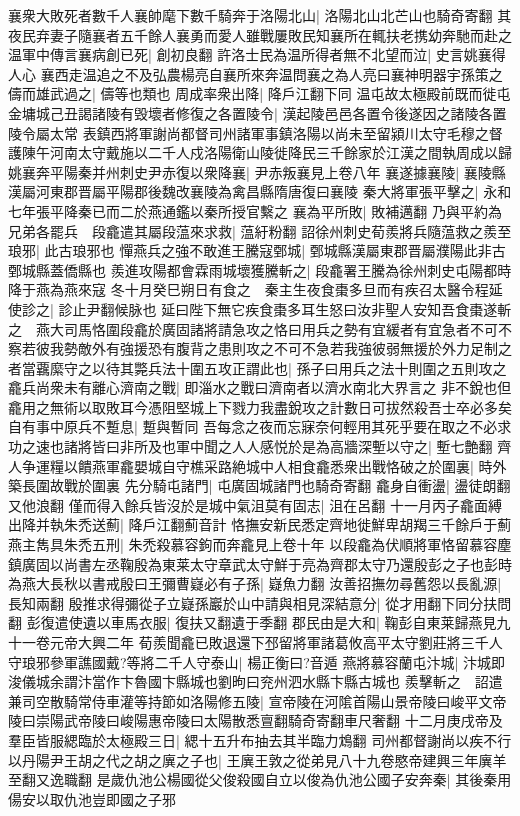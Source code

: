 襄衆大敗死者數千人襄帥麾下數千騎奔于洛陽北山|{
	洛陽北山北芒山也騎奇寄翻}
其夜民弃妻子隨襄者五千餘人襄勇而愛人雖戰屢敗民知襄所在輒扶老携幼奔馳而赴之温軍中傳言襄病創已死|{
	創初良翻}
許洛士民為温所得者無不北望而泣|{
	史言姚襄得人心}
襄西走温追之不及弘農楊亮自襄所來奔温問襄之為人亮曰襄神明器宇孫策之儔而雄武過之|{
	儔等也類也}
周成率衆出降|{
	降戶江翻下同}
温屯故太極殿前既而徙屯金墉城己丑謁諸陵有毁壞者修復之各置陵令|{
	漢起陵邑邑各置令後遂因之諸陵各置陵令屬太常}
表鎮西將軍謝尚都督司州諸軍事鎮洛陽以尚未至留潁川太守毛穆之督護陳午河南太守戴施以二千人戍洛陽衛山陵徙降民三千餘家於江漢之間執周成以歸姚襄奔平陽秦并州刺史尹赤復以衆降襄|{
	尹赤叛襄見上卷八年}
襄遂據襄陵|{
	襄陵縣漢屬河東郡晋屬平陽郡後魏改襄陵為禽昌縣隋唐復曰襄陵}
秦大將軍張平擊之|{
	永和七年張平降秦已而二於燕通鑑以秦所授官繫之}
襄為平所敗|{
	敗補邁翻}
乃與平約為兄弟各罷兵　段龕遣其屬段蕰來求救|{
	蕰紆粉翻}
詔徐州刺史荀羨將兵隨蕰救之羨至琅邪|{
	此古琅邪也}
憚燕兵之強不敢進王騰寇鄄城|{
	鄄城縣漢屬東郡晋屬濮陽此非古鄄城縣蓋僑縣也}
羨進攻陽都會霖雨城壞獲騰斬之|{
	段龕署王騰為徐州刺史屯陽都時降于燕為燕來寇}
冬十月癸巳朔日有食之　秦主生夜食棗多旦而有疾召太醫令程延使診之|{
	診止尹翻候脉也}
延曰陛下無它疾食棗多耳生怒曰汝非聖人安知吾食棗遂斬之　燕大司馬恪圍段龕於廣固諸將請急攻之恪曰用兵之勢有宜緩者有宜急者不可不察若彼我勢敵外有強援恐有腹背之患則攻之不可不急若我強彼弱無援於外力足制之者當覊縻守之以待其斃兵法十圍五攻正謂此也|{
	孫子曰用兵之法十則圍之五則攻之}
龕兵尚衆未有離心濟南之戰|{
	即淄水之戰曰濟南者以濟水南北大界言之}
非不銳也但龕用之無術以取敗耳今憑阻堅城上下戮力我盡銳攻之計數日可拔然殺吾士卒必多矣自有事中原兵不蹔息|{
	蹔與暫同}
吾每念之夜而忘寐奈何輕用其死乎要在取之不必求功之速也諸將皆曰非所及也軍中聞之人人感悦於是為高牆深塹以守之|{
	塹七艶翻}
齊人争運糧以饋燕軍龕嬰城自守樵采路絶城中人相食龕悉衆出戰恪破之於圍裏|{
	時外築長圍故戰於圍裏}
先分騎屯諸門|{
	屯廣固城諸門也騎奇寄翻}
龕身自衝盪|{
	盪徒朗翻又他浪翻}
僅而得入餘兵皆沒於是城中氣沮莫有固志|{
	沮在呂翻}
十一月丙子龕面縛出降并執朱禿送薊|{
	降戶江翻薊音計}
恪撫安新民悉定齊地徙鮮卑胡羯三千餘戶于薊燕主雋具朱禿五刑|{
	朱禿殺慕容鉤而奔龕見上卷十年}
以段龕為伏順將軍恪留慕容塵鎮廣固以尚書左丞鞠殷為東莱太守章武太守鮮于亮為齊郡太守乃還殷彭之子也彭時為燕大長秋以書戒殷曰王彌曹嶷必有子孫|{
	嶷魚力翻}
汝善招撫勿尋舊怨以長亂源|{
	長知兩翻}
殷推求得彌從子立嶷孫巖於山中請與相見深結意分|{
	從才用翻下同分扶問翻}
彭復遣使遺以車馬衣服|{
	復扶又翻遺于季翻}
郡民由是大和|{
	鞠彭自東莱歸燕見九十一卷元帝大興二年}
荀羨聞龕已敗退還下邳留將軍諸葛攸高平太守劉莊將三千人守琅邪參軍譙國戴?等將二千人守泰山|{
	楊正衡曰?音遁}
燕將慕容蘭屯汴城|{
	汴城即浚儀城余謂汴當作卞魯國卞縣城也劉昫曰兖州泗水縣卞縣古城也}
羨擊斬之　詔遣兼司空散騎常侍車灌等持節如洛陽修五陵|{
	宣帝陵在河隂首陽山景帝陵曰峻平文帝陵曰崇陽武帝陵曰峻陽惠帝陵曰太陽散悉亶翻騎奇寄翻車尺奢翻}
十二月庚戌帝及羣臣皆服緦臨於太極殿三日|{
	緦十五升布抽去其半臨力鴆翻}
司州都督謝尚以疾不行以丹陽尹王胡之代之胡之廙之子也|{
	王廙王敦之從弟見八十九卷愍帝建興三年廙羊至翻又逸職翻}
是歲仇池公楊國從父俊殺國自立以俊為仇池公國子安奔秦|{
	其後秦用偒安以取仇池豈即國之子邪}


